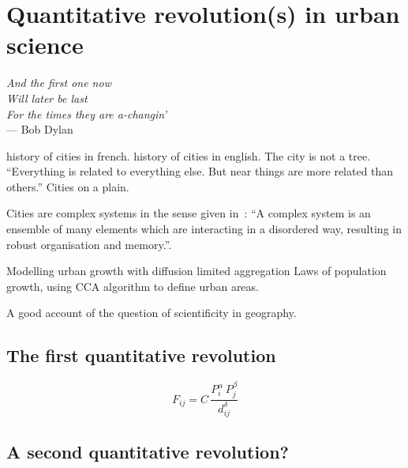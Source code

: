 

\chapter{Quantitative revolution(s) in urban science}
\label{chap:quantitative_revolutions}

\begin{flushright}{\slshape    
And the first one now\\
Will later be last\\
For the times they are a-changin'} \\ \medskip
--- Bob Dylan 
\end{flushright}


\bigskip


\cite{Bairoch:1985} history of cities in french.
\cite{Mumford:1961} history of cities in english.
\cite{Alexander:1964} The city is not a tree.
\cite{Tobler:1970} ``Everything is related to everything else. But near things
are more related than others.''
\cite{Glass:1971} Cities on a plain.


Cities are complex systems in the sense given in~\cite{Ladyman:2013}: ``A complex system is an ensemble of many elements
which are interacting in a disordered way, resulting in robust organisation and
memory.''.


\cite{Makse:1995} Modelling urban growth with diffusion limited aggregation
\cite{Rozenfeld:2008} Laws of population growth, using CCA algorithm to define
urban areas.

\cite{Sanders:2011} A good account of the question of scientificity in
geography.

\section{The first quantitative revolution}
\label{sec:the_first_quantitative_revolution}


\begin{equation}
    F_{ij} = C\, \frac{P_i^\alpha\,P_j^\beta}{d_{ij}^\delta}
\end{equation}

\section{A second quantitative revolution?}
\label{sec:a_second_quantitative_revolution_}

